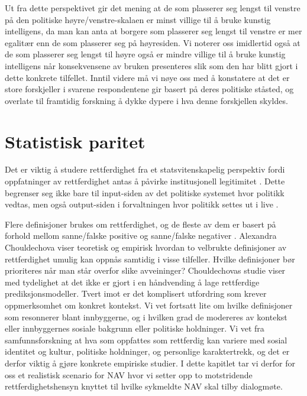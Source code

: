 \documentclass[
]{book}
\begin{document}
Ut fra dette perspektivet gir det mening at de som plasserer seg lengst til venstre på den politiske høyre/venstre-skalaen er minst villige til å bruke kunstig intelligens, da man kan anta at borgere som plasserer seg lengst til venstre er mer egalitær enn de som plasserer seg på høyresiden.
Vi noterer oss imidlertid også at de som plasserer seg lengst til høyre også er mindre villige til å bruke kunstig intelligens når konsekvensene av bruken presenteres slik som den har blitt gjort i dette konkrete tilfellet.
Inntil videre må vi nøye oss med å konstatere at det er store forskjeller i svarene respondentene gir basert på deres politiske ståsted, og overlate til framtidig forskning å dykke dypere i hva denne forskjellen skyldes.

\hypertarget{paritet}{%
\chapter{Statistisk paritet}\label{paritet}}

Det er viktig å studere rettferdighet fra et statsvitenskapelig perspektiv fordi oppfatninger av rettferdighet antas å påvirke institusjonell legitimitet \citep{tyler2003procedural}.
Dette begrenser seg ikke bare til input-siden av det politiske systemet hvor politikk vedtas, men også output-siden i forvaltningen hvor politikk settes ut i live \citep{krislov2012representative, rosanvallon2011democratic, rothstein2009creating}.

Flere definisjoner brukes om rettferdighet, og de fleste av dem er basert på forhold mellom sanne/falske positive og sanne/falske negativer \citep{verma2018fairness}.
Alexandra Chouldechova \citeyearpar{chouldechova2018case} viser teoretisk og empirisk hvordan to velbrukte definisjoner av rettferdighet umulig kan oppnås samtidig i visse tilfeller.
Hvilke definisjoner bør prioriteres når man står overfor slike avveininger?
Chouldechovas studie viser med tydelighet at det ikke er gjort i en håndvending å lage rettferdige prediksjonsmodeller.
Tvert imot er det komplisert utfordring som krever oppmerksomhet om konkret kontekst.
Vi vet fortsatt lite om hvilke definisjoner som resonnerer blant innbyggerne, og i hvilken grad de modereres av kontekst eller innbyggernes sosiale bakgrunn eller politiske holdninger.
Vi vet fra samfunnsforskning at hva som oppfattes som rettferdig kan variere med sosial identitet og kultur, politiske holdninger, og personlige karaktertrekk, og det er derfor viktig å gjøre konkrete empiriske studier.
I dette kapitlet tar vi derfor for oss et realistisk scenario for NAV hvor vi setter opp to motstridende rettferdighetshensyn knyttet til hvilke sykmeldte NAV skal tilby dialogmøte.
\end{document}
